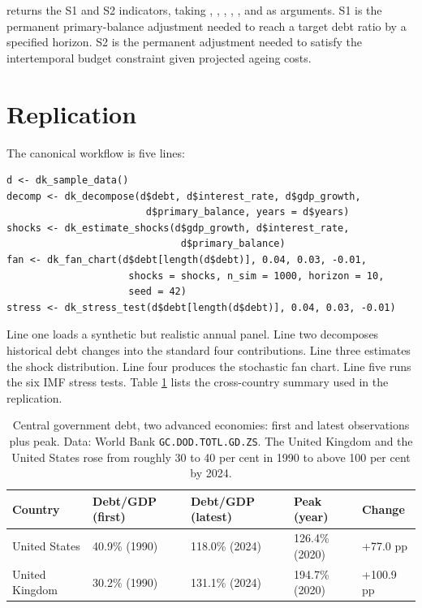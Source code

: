  returns the S1 and S2 indicators,
taking , , ,
, , and  as
arguments. S1 is the permanent primary-balance adjustment needed
to reach a target debt ratio by a specified horizon. S2 is the
permanent adjustment needed to satisfy the intertemporal budget
constraint given projected ageing costs.

\section{Replication}\label{replication}

The canonical workflow is five lines:

\begin{verbatim}
d <- dk_sample_data()
decomp <- dk_decompose(d$debt, d$interest_rate, d$gdp_growth,
                        d$primary_balance, years = d$years)
shocks <- dk_estimate_shocks(d$gdp_growth, d$interest_rate,
                              d$primary_balance)
fan <- dk_fan_chart(d$debt[length(d$debt)], 0.04, 0.03, -0.01,
                     shocks = shocks, n_sim = 1000, horizon = 10,
                     seed = 42)
stress <- dk_stress_test(d$debt[length(d$debt)], 0.04, 0.03, -0.01)
\end{verbatim}

Line one loads a synthetic but realistic annual panel. Line two
decomposes historical debt changes into the standard four
contributions. Line three estimates the shock distribution. Line
four produces the stochastic fan chart. Line five runs the six
IMF stress tests. Table \ref{tab:debt-panel} lists the
cross-country summary used in the replication.

\begin{table}

\caption{\label{tab:debt-panel}Central government debt, two advanced economies: first and latest observations plus peak. Data: World Bank \texttt{GC.DOD.TOTL.GD.ZS}. The United Kingdom and the United States rose from roughly 30 to 40 per cent in 1990 to above 100 per cent by 2024.}
\centering
\begin{tabular}[t]{lllll}
\toprule
Country & Debt/GDP (first) & Debt/GDP (latest) & Peak (year) & Change\\
\midrule
United States & 40.9\% (1990) & 118.0\% (2024) & 126.4\% (2020) & +77.0 pp\\
United Kingdom & 30.2\% (1990) & 131.1\% (2024) & 194.7\% (2020) & +100.9 pp\\
\bottomrule
\end{tabular}
\end{table}

